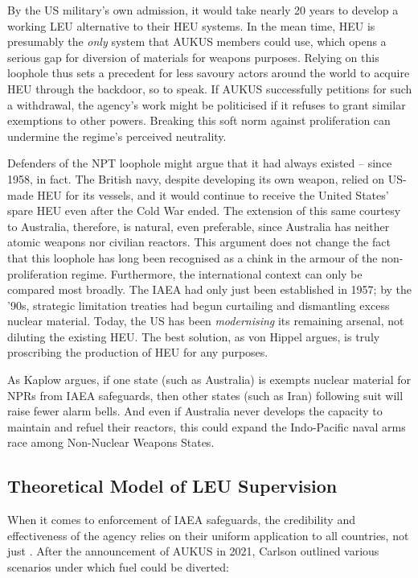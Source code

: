 \documentclass[letterpaper,12pt,twoside]{article} %
\begin{document}
\begin{multicols}{2}
By the US military's own admission, it would take nearly 20 years to develop a working LEU alternative to their HEU systems. In the mean time, HEU is presumably the \textit{only} system that AUKUS members could use, which opens a serious gap for diversion of materials for weapons purposes. Relying on this loophole thus sets a precedent for less savoury actors around the world to acquire HEU through the backdoor, so to speak. If AUKUS successfully petitions for such a withdrawal, the agency's work might be politicised if it refuses to grant similar exemptions to other powers. Breaking this soft norm against proliferation can undermine the regime's perceived neutrality.

Defenders of the NPT loophole might argue that it had always existed -- since 1958, in fact. The British navy, despite developing its own weapon, relied on US-made HEU for its vessels, and it would continue to receive the United States' spare HEU even after the Cold War ended.\autocite[39. Footnote 32.]{hippel2016banning} The extension of this same courtesy to Australia, therefore, is natural, even preferable, since Australia has neither atomic weapons nor civilian reactors. This argument does not change the fact that this loophole has long been recognised as a chink in the armour of the non-proliferation regime. Furthermore, the international context can only be compared most broadly. The IAEA had only just been established in 1957; by the '90s, strategic limitation treaties had begun curtailing and dismantling excess nuclear material. Today, the US has been \textit{modernising} its remaining arsenal, not diluting the existing HEU. The best solution, as von Hippel\autocite{hippel2016banning} argues, is truly proscribing the production of HEU for any purposes.

As Kaplow argues, if one state (such as Australia) is exempts nuclear material for NPRs from IAEA safeguards, then other states (such as Iran) following suit will raise fewer alarm bells.\autocite[186]{kaplow2015canary} And even if Australia never develops the capacity to maintain and refuel their reactors, this could expand the Indo-Pacific naval arms race among Non-Nuclear Weapons States.


\subsection*{Theoretical Model of LEU Supervision}

When it comes to enforcement of IAEA safeguards, the credibility and effectiveness of the agency relies on their uniform application to all countries, not just . After the announcement of AUKUS in 2021, Carlson outlined various scenarios under which fuel could be diverted:\autocite[5]{carlson2021aukus}


\end{multicols}
\end{document}
